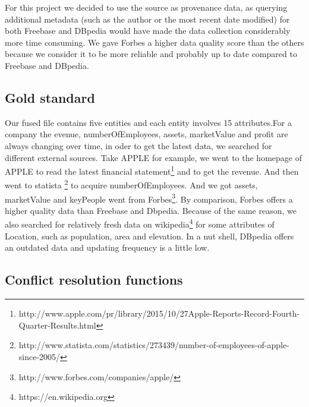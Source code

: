 

For this project we decided to use the source as provenance data, as querying additional metadata (such as the author or the most recent date modified) for both Freebase and DBpedia would have made the data collection considerably more time consuming. We gave Forbes a higher data quality score than the others because we consider it to be more reliable and probably up to date compared to Freebase and DBpedia.




\subsection{Gold standard}
Our fused file contains five entities and each entity involves 15 attributes.For a company the evenue, numberOfEmployees, assets, marketValue and profit are always changing over time, in oder to get the latest data, we searched for different external sources. Take APPLE for example, we went to the homepage of APPLE  to read the latest financial statement\footnote{http://www.apple.com/pr/library/2015/10/27Apple-Reports-Record-Fourth-Quarter-Results.html} and to get the revenue. And then went to statista \footnote{http://www.statista.com/statistics/273439/number-of-employees-of-apple-since-2005/} to acquire numberOfEmployees. And we got assets, marketValue and keyPeople went from Forbes\footnote{http://www.forbes.com/companies/apple/}. By comparison, Forbes offers a higher quality data than Freebase and Dbpedia. Because of the same reason, we also searched for relatively fresh data on wikipedia\footnote{https://en.wikipedia.org} for some attributes of Location, such as population, area and elevation. In a nut shell, DBpedia offers an outdated data and updating frequency is a little low.
 

\subsection{Conflict resolution functions}

